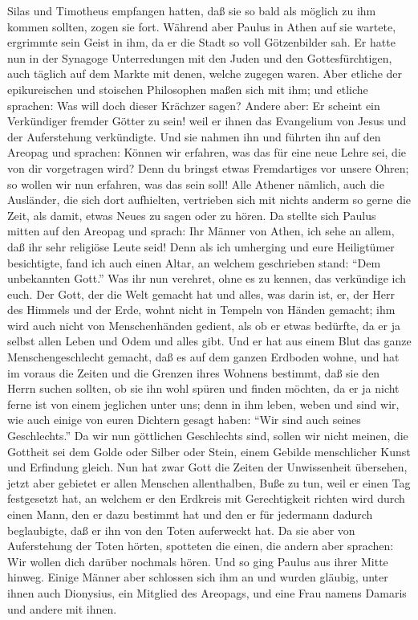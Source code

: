 Silas und Timotheus empfangen hatten, daß sie so bald als möglich zu ihm
kommen sollten, zogen sie fort.  Während aber Paulus in
Athen auf sie wartete, ergrimmte sein Geist in ihm, da er die Stadt so
voll Götzenbilder sah.  Er hatte nun in der Synagoge
Unterredungen mit den Juden und den Gottesfürchtigen, auch täglich auf
dem Markte mit denen, welche zugegen waren.  Aber etliche
der epikureischen und stoischen Philosophen maßen sich mit ihm; und
etliche sprachen: Was will doch dieser Krächzer sagen? Andere aber: Er
scheint ein Verkündiger fremder Götter zu sein! weil er ihnen das
Evangelium von Jesus und der Auferstehung verkündigte. 
Und sie nahmen ihn und führten ihn auf den Areopag und sprachen: Können
wir erfahren, was das für eine neue Lehre sei, die von dir vorgetragen
wird?  Denn du bringst etwas Fremdartiges vor unsere
Ohren; so wollen wir nun erfahren, was das sein soll! 
Alle Athener nämlich, auch die Ausländer, die sich dort aufhielten,
vertrieben sich mit nichts anderm so gerne die Zeit, als damit, etwas
Neues zu sagen oder zu hören.  Da stellte sich Paulus
mitten auf den Areopag und sprach: Ihr Männer von Athen, ich sehe an
allem, daß ihr sehr religiöse Leute seid!  Denn als ich
umherging und eure Heiligtümer besichtigte, fand ich auch einen Altar,
an welchem geschrieben stand: ``Dem unbekannten Gott.'' Was ihr nun
verehret, ohne es zu kennen, das verkündige ich euch. 
Der Gott, der die Welt gemacht hat und alles, was darin ist, er, der
Herr des Himmels und der Erde, wohnt nicht in Tempeln von Händen
gemacht;  ihm wird auch nicht von Menschenhänden gedient,
als ob er etwas bedürfte, da er ja selbst allen Leben und Odem und alles
gibt.  Und er hat aus einem Blut das ganze
Menschengeschlecht gemacht, daß es auf dem ganzen Erdboden wohne, und
hat im voraus die Zeiten und die Grenzen ihres Wohnens bestimmt,
 daß sie den Herrn suchen sollten, ob sie ihn wohl spüren
und finden möchten, da er ja nicht ferne ist von einem jeglichen unter
uns;  denn in ihm leben, weben und sind wir, wie auch
einige von euren Dichtern gesagt haben: ``Wir sind auch seines
Geschlechts.''  Da wir nun göttlichen Geschlechts sind,
sollen wir nicht meinen, die Gottheit sei dem Golde oder Silber oder
Stein, einem Gebilde menschlicher Kunst und Erfindung gleich.
 Nun hat zwar Gott die Zeiten der Unwissenheit übersehen,
jetzt aber gebietet er allen Menschen allenthalben, Buße zu tun,
 weil er einen Tag festgesetzt hat, an welchem er den
Erdkreis mit Gerechtigkeit richten wird durch einen Mann, den er dazu
bestimmt hat und den er für jedermann dadurch beglaubigte, daß er ihn
von den Toten auferweckt hat.  Da sie aber von
Auferstehung der Toten hörten, spotteten die einen, die andern aber
sprachen: Wir wollen dich darüber nochmals hören.  Und so
ging Paulus aus ihrer Mitte hinweg.  Einige Männer aber
schlossen sich ihm an und wurden gläubig, unter ihnen auch Dionysius,
ein Mitglied des Areopags, und eine Frau namens Damaris und andere mit
ihnen.


